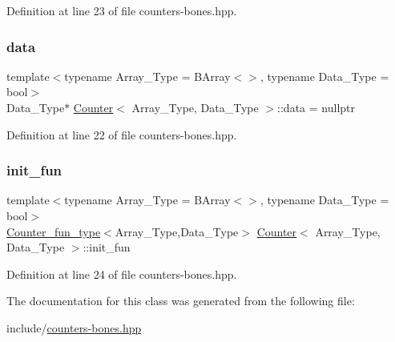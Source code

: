 Definition at line 23 of file counters-\/bones.\+hpp.

\mbox{\label{class_counter_a9ebfed99a67888f80c19cabc4098bdd0}} 
\subsubsection{\texorpdfstring{data}{data}}
{\footnotesize\ttfamily template$<$typename Array\+\_\+\+Type = B\+Array$<$$>$, typename Data\+\_\+\+Type = bool$>$ \\
Data\+\_\+\+Type$\ast$ \hyperlink{class_counter}{Counter}$<$ Array\+\_\+\+Type, Data\+\_\+\+Type $>$\+::data = nullptr}



Definition at line 22 of file counters-\/bones.\+hpp.

\mbox{\label{class_counter_abb4e0b67e6489d438918495651baa5a8}} 
\subsubsection{\texorpdfstring{init\+\_\+fun}{init\_fun}}
{\footnotesize\ttfamily template$<$typename Array\+\_\+\+Type = B\+Array$<$$>$, typename Data\+\_\+\+Type = bool$>$ \\
\hyperlink{typedefs_8hpp_ac0160f52f564dea3ac033b374cffbfe7}{Counter\+\_\+fun\+\_\+type}$<$Array\+\_\+\+Type,Data\+\_\+\+Type$>$ \hyperlink{class_counter}{Counter}$<$ Array\+\_\+\+Type, Data\+\_\+\+Type $>$\+::init\+\_\+fun}



Definition at line 24 of file counters-\/bones.\+hpp.



The documentation for this class was generated from the following file\+:\begin{DoxyCompactItemize}
\item 
include/\hyperlink{counters-bones_8hpp}{counters-\/bones.\+hpp}\end{DoxyCompactItemize}
